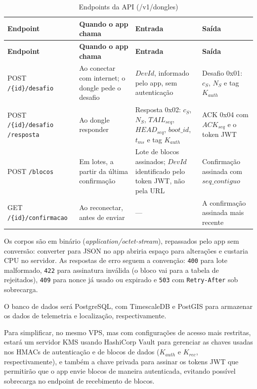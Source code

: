\documentclass[
	12pt,
	article,			%
	oneside,
	a4paper,
	english,
	brazil				%
	]{abntex2}
\begin{document}
\begin{longtable}{|>{\raggedright\arraybackslash}p{}|>{\raggedright\arraybackslash}p{}|>{\raggedright\arraybackslash}p{}|>{\raggedright\arraybackslash}p{}|}
	\caption{Endpoints da API (/v1/dongles)}
	\label{table:endpoints-api} \\
	\hline
	\textbf{Endpoint} & \textbf{Quando o app chama} & \textbf{Entrada} & \textbf{Saída} \\
	\hline
	\endfirsthead
	\hline
	\textbf{Endpoint} & \textbf{Quando o app chama} & \textbf{Entrada} & \textbf{Saída} \\
	\hline
	\endhead
	\hline
	\endfoot
	POST \texttt{/\{id\}/desafio} & Ao conectar com internet; o dongle pede o desafio & $DevId$, informado pelo app, sem autenticação & Desafio 0x01: $c_S$, $N_S$ e tag $K_{auth}$ \\
	\hline
	POST \texttt{/\{id\}/desafio} \newline \texttt{/resposta} & Ao dongle responder & Resposta 0x02: $c_S$, $N_S$, $TAIL_{seq}$, $HEAD_{seq}$, $boot\_id$, $t_{ms}$ e tag $K_{auth}$ & ACK 0x04 com $ACK_{seq}$ e o token JWT \\
	\hline
	POST \texttt{/blocos} & Em lotes, a partir da última confirmação & Lote de blocos assinados; $DevId$ identificado pelo token JWT, não pela URL & Confirmação assinada com $seq\_contiguo$ \\
	\hline
	GET \texttt{/\{id\}/confirmacao} & Ao reconectar, antes de enviar & --- & A confirmação assinada mais recente \\
\end{longtable}

Os corpos são em binário (\textit{application/octet-stream}), repassados pelo app sem conversão: converter para JSON no app abriria espaço
para alterações e custaria CPU no servidor. As respostas de erro seguem a convenção: \texttt{400} para lote malformado, \texttt{422} para
assinatura inválida (o bloco vai para a tabela de rejeitados), \texttt{409} para nonce já usado ou expirado e \texttt{503} com
\texttt{Retry-After} sob sobrecarga.

O banco de dados será PostgreSQL, com TimescaleDB e PostGIS para armazenar os dados de telemetria e localização, respectivamente.

Para simplificar, no mesmo VPS, mas com configurações de acesso mais restritas, estará um servidor KMS usando HashiCorp Vault para gerenciar as
chaves usadas nos HMACs de autenticação e de blocos de dados ($K_{auth}$ e $K_{rec}$, respectivamente), e também a chave privada para assinar os
tokens JWT que permitirão que o app envie blocos de maneira autenticada, evitando possível sobrecarga no endpoint de recebimento de blocos. 
\end{document}
